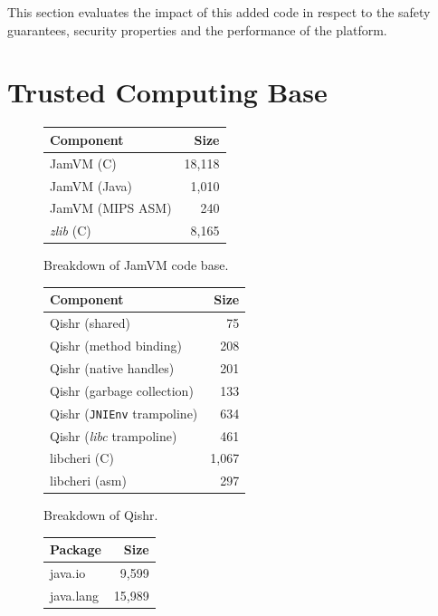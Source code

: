 \documentclass[a4paper,12pt,twoside,openright]{report}
\newcommand{\tool}[1]{\emph{#1}}
\newcommand{\lib}[1]{\tool{lib#1}}
\begin{document}
This section evaluates the impact of this added code in respect to the safety guarantees, security properties and the performance of the platform. 

\section{Trusted Computing Base}

\begin{table}[h]
	\centering
	\begin{subfigure}{0.45\textwidth}
		\centering
		\footnotesize
		\begin{tabular}{|l|r|}
		\hline
		\bf Component		& \bf Size		\\
		\hline
		JamVM (C)		& 18,118		\\
		JamVM (Java)		& 1,010		\\
		JamVM (MIPS ASM)	& 240		\\
		\emph{zlib} (C)		& 8,165		\\
		\hline
		\end{tabular}
		\caption{Breakdown of JamVM code base.}
		\label{table:JamTCB}
	\end{subfigure}
	\begin{subfigure}{0.45\textwidth}
		\centering
		\footnotesize
		\begin{tabular}{|l|r|}
		\hline
		\bf Component			& \bf Size		\\
		\hline
		Qishr (shared)			& 75			\\
		Qishr (method binding)	& 208 		\\
		Qishr (native handles)	& 201		\\
		Qishr (garbage collection)	& 133		\\				
		Qishr (\texttt{JNIEnv} trampoline)	& 634		\\
		Qishr (\lib{c} trampoline)	& 461		\\
		libcheri (C)				& 1,067		\\
		libcheri (asm)			& 297		\\
		\hline
		\end{tabular}
		\caption{Breakdown of Qishr.}
		\label{table:QishrTCB}
	\end{subfigure}
	\begin{subfigure}{0.45\textwidth}
		\centering
		\footnotesize
		\begin{tabular}{|l|r|}
		\hline
		\bf Package	& \bf Size		\\
		\hline
		java.io		& 9,599		\\ %
		java.lang		& 15,989		\\ %

\end{tabular}
\end{subfigure}
\end{table}
\end{document}
